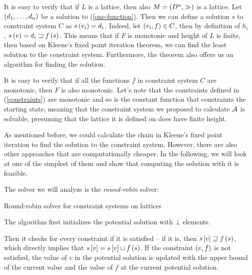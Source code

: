 \documentclass[..thesis.tex]{subfiles}
\begin{document}
It is easy to verify that if $L$ is a lattice, then also $M = \left( D^n, \gg \right)$ is a lattice. Let $\left( d_1, \ldots, d_n \right) $ be a solution to (\ref{one-function}). Then we can define a solution $s$ to constraint system $C$ as $s \left( v_i \right) = d_i$. Indeed, let $ \left( v_i, f \right) \in C$, then by definition of $h_i$, $s \left( v \right) = d_i \sqsupset f \left( s \right)$. This means that if $F$ is monotonic and height of $L$ is finite, then based on Kleene's fixed point iteration theorem, we can find the least solution to the constraint system. Furthermore, the theorem also offers us an algorithm for finding the solution.

It is easy to verify that if all the functions $f$ in constraint system $C$ are monotonic, then $F$ is also monotonic. Let's note that the constraints defined in (\ref{constraints}) are monotonic and so is the constant function that constraints the starting state, meaning that the constraint system we proposed to calculate $\mathcal{A}$ is solvable, presuming that the lattice it is defined on does have finite height.


As mentioned before, we could calculate the chain in Kleene's fixed point iteration to find the solution to the constraint system. However, there are also other approaches that are computationally cheaper. In the following, we will look at one of the simplest of them and show that computing the solution with it is feasible.

The solver we will analyze is the \textit{round-robin} solver:


\begin{algorithm}[H]
\label{round-robin}
\caption{Round-robin solver for constraint systems on lattices}
\end{algorithm}
The algorithm first initializes the potential solution with $\bot$ elements.

Then it checks for every constraint if it is satisfied -- if it is, then $s \left[ v \right] \sqsupseteq f \left( s \right)$, which directly implies that $s \left[ v \right] = s \left[ v \right] \sqcup f \left( s \right)$. If the constraint $\left( v, f \right)$  is not satisfied, the value of $v$ in the potential solution is updated with the upper bound of the current value and the value of  $f$ at the current potential solution.
\end{document}
